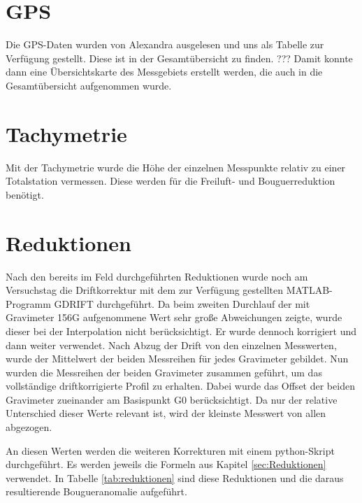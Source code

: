 
\section{GPS}

Die GPS-Daten wurden von Alexandra ausgelesen und uns als Tabelle zur Verfügung gestellt. Diese ist in der Gesamtübersicht zu finden. ??? Damit konnte dann eine Übersichtskarte des Messgebiets erstellt werden, die auch in die Gesamtübersicht aufgenommen wurde.

\section{Tachymetrie}

Mit der Tachymetrie wurde die Höhe der einzelnen Messpunkte relativ zu einer Totalstation vermessen. Diese werden für die Freiluft- und Bouguerreduktion benötigt.


\section{Reduktionen}

Nach den bereits im Feld durchgeführten Reduktionen wurde noch am Versuchstag die Driftkorrektur mit dem zur Verfügung gestellten MATLAB-Programm GDRIFT durchgeführt. Da beim zweiten Durchlauf der mit Gravimeter 156G aufgenommene Wert sehr große Abweichungen zeigte, wurde dieser bei der Interpolation nicht berücksichtigt. Er wurde dennoch korrigiert und dann weiter verwendet. Nach Abzug der Drift von den einzelnen Messwerten, wurde der Mittelwert der beiden Messreihen für jedes Gravimeter gebildet. Nun wurden die Messreihen der beiden Gravimeter zusammen geführt, um das vollständige driftkorrigierte Profil zu erhalten. Dabei wurde das Offset der beiden Gravimeter zueinander am Basispunkt G0 berücksichtigt. Da nur der relative Unterschied dieser Werte relevant ist, wird der kleinste Messwert von allen abgezogen.

An diesen Werten werden die weiteren Korrekturen mit einem python-Skript durchgeführt. Es werden jeweils die Formeln aus Kapitel \ref{sec:Reduktionen} verwendet. In Tabelle \ref{tab:reduktionen} sind diese Reduktionen und die daraus resultierende Bougueranomalie aufgeführt.


